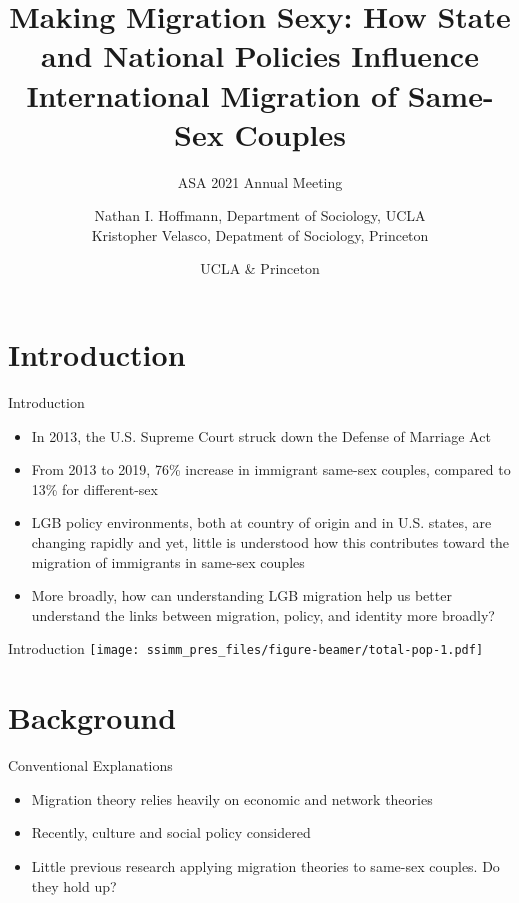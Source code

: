 \documentclass[
  ignorenonframetext,
]{beamer}
\title{Making Migration Sexy: How State and National Policies Influence
International Migration of Same-Sex Couples}
\subtitle{ASA 2021 Annual Meeting}
\author{Nathan I. Hoffmann, Department of Sociology, UCLA\\
Kristopher Velasco, Depatment of Sociology, Princeton}
\date{UCLA \& Princeton}
\providecommand{\tightlist}{%
  \setlength{\itemsep}{0pt}\setlength{\parskip}{0pt}}
\begin{document}
\frame{\titlepage}

\hypertarget{introduction}{%
\section{Introduction}\label{introduction}}

\begin{frame}{Introduction}
\protect\hypertarget{introduction-1}{}
\begin{itemize}
\tightlist
\item
  In 2013, the U.S. Supreme Court struck down the Defense of Marriage
  Act
\item
  From 2013 to 2019, 76\% increase in immigrant same-sex couples,
  compared to 13\% for different-sex
\item
  LGB policy environments, both at country of origin and in U.S. states,
  are changing rapidly and yet, little is understood how this
  contributes toward the migration of immigrants in same-sex couples
\item
  More broadly, how can understanding LGB migration help us better
  understand the links between migration, policy, and identity more
  broadly?
\end{itemize}
\end{frame}

\begin{frame}{Introduction}
\protect\hypertarget{introduction-2}{}
\texttt{[image: ssimm\_pres\_files/figure-beamer/total-pop-1.pdf]}
\end{frame}

\hypertarget{background}{%
\section{Background}\label{background}}

\begin{frame}{Conventional Explanations}
\protect\hypertarget{conventional-explanations}{}
\begin{itemize}
\tightlist
\item
  Migration theory relies heavily on economic and network theories
\item
  Recently, culture and social policy considered
\item
  Little previous research applying migration theories to same-sex
  couples. Do they hold up?
\end{itemize}
\end{frame}
\end{document}
